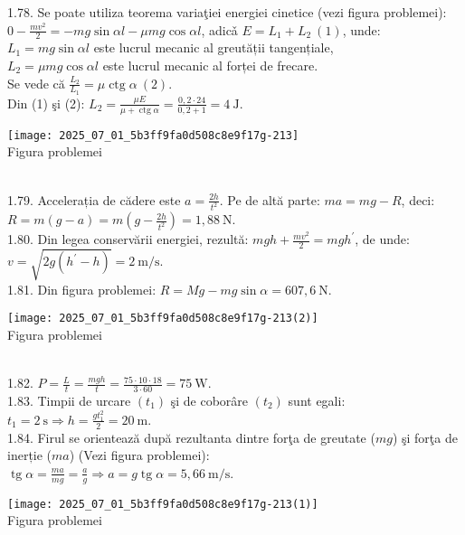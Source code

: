 1.78. Se poate utiliza teorema variaţiei energiei cinetice (vezi figura problemei): $0-\frac{m v^{2}}{2}=-m g \sin \alpha l-\mu m g \cos \alpha l$, adicǎ $E=L_{1}+L_{2}\ (1)$, unde:\\ $L_{1}=m g \sin \alpha l$ este lucrul mecanic al greutății tangențiale,\\ $L_{2}=\mu m g \cos \alpha l$ este lucrul mecanic al forței de frecare.\\ Se vede că $\frac{L_{2}}{L_{1}}=\mu \operatorname{ctg} \alpha\ (2)$.\\ Din (1) şi (2): $L_{2}=\frac{\mu E}{\mu+\operatorname{ctg} \alpha}=\frac{0,2 \cdot 24}{0,2+1}=4 \mathrm{~J}$.\\ \begin{center} \texttt{[image: 2025\_07\_01\_5b3ff9fa0d508c8e9f17g-213]}\\ Figura problemei \end{center}\\

1.79. Accelerația de cădere este $a=\frac{2 h}{t^{2}}$. Pe de altă parte: $m a=m g-R$, deci:\\ $R=m(g-a)=m\left(g-\frac{2 h}{t^{2}}\right)=1,88 \mathrm{~N}$.\\

1.80. Din legea conservării energiei, rezultă: $m g h+\frac{m v^{2}}{2}=m g h^{\prime}$, de unde:\\ $v=\sqrt{2 g\left(h^{\prime}-h\right)}=2 \mathrm{~m} / \mathrm{s}$.\\

1.81. Din figura problemei: $R=M g-m g \sin \alpha=607,6 \mathrm{~N}$.\\ \begin{center} \texttt{[image: 2025\_07\_01\_5b3ff9fa0d508c8e9f17g-213(2)]}\\ Figura problemei \end{center}\\

1.82. $P=\frac{L}{t}=\frac{m g h}{t}=\frac{75 \cdot 10 \cdot 18}{3 \cdot 60}=75 \mathrm{~W}$.\\

1.83. Timpii de urcare $\left(t_{1}\right)$ şi de coborâre $\left(t_{2}\right)$ sunt egali:\\ $t_{1}=2 \mathrm{~s} \Rightarrow h=\frac{g t_{1}^{2}}{2}=20 \mathrm{~m}$.\\

1.84. Firul se orientează după rezultanta dintre forţa de greutate ($m g$) şi forţa de inerție ($m a$) (Vezi figura problemei):\\ $\operatorname{tg} \alpha=\frac{m a}{m g}=\frac{a}{g} \Rightarrow a=g \operatorname{tg} \alpha=5,66 \mathrm{~m} / \mathrm{s}$.\\ \begin{center} \texttt{[image: 2025\_07\_01\_5b3ff9fa0d508c8e9f17g-213(1)]}\\ Figura problemei \end{center}\\

